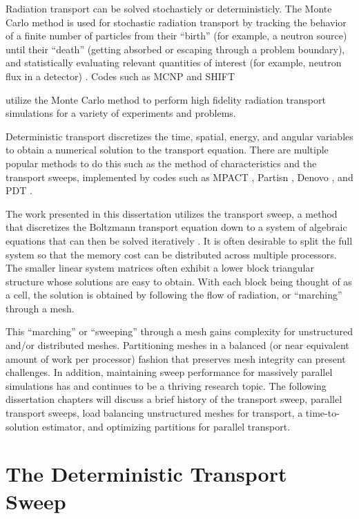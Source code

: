 Radiation transport can be solved stochasticly or deterministicly.
The Monte Carlo method is used for stochastic radiation transport by tracking the behavior of a finite number of particles from their ``birth'' (for example, a neutron source) until their ``death'' (getting absorbed or escaping through a problem boundary), and statistically evaluating relevant quantities of interest (for example, neutron flux in a detector) \cite{shultis_mc}.
Codes such as MCNP \cite{MCNP} and SHIFT {\cite{shift} utilize the Monte Carlo method to perform high fidelity radiation transport simulations for a variety of experiments and problems. 

Deterministic transport discretizes the time, spatial, energy, and angular variables to obtain a numerical solution to the transport equation.
There are multiple popular methods to do this such as the method of characteristics and the transport sweeps, implemented by codes such as MPACT \cite{mpact}, Partisn \cite{partisn}, Denovo \cite{denovo}, and PDT \cite{mpadams2013,mpadams2015}. 

The work presented in this dissertation utilizes the transport sweep, a method that discretizes the Boltzmann transport equation \cite{bell_glasstone,zweifel,davison,duderstadt} down to a system of algebraic equations that can then be solved iteratively \cite{adams_larsen}.
It is often desirable to split the full system so that the memory cost can be distributed across multiple processors. 
The smaller linear system matrices often exhibit a lower block triangular structure whose solutions are easy to obtain.
With each block being thought of as a cell, the solution is obtained by following the flow of radiation, or ``marching'' through a mesh.

This ``marching'' or ``sweeping'' through a mesh gains complexity for unstructured and/or distributed meshes. Partitioning meshes in a balanced (or near equivalent amount of work per processor) fashion that preserves mesh integrity can present challenges.
In addition, maintaining sweep performance for massively parallel simulations has and continues to be a thriving research topic.
The following dissertation chapters will discuss a brief history of the transport sweep, parallel transport sweeps, load balancing unstructured meshes for transport, a time-to-solution estimator, and optimizing partitions for parallel transport. 

\section{The Deterministic Transport Sweep}

}
